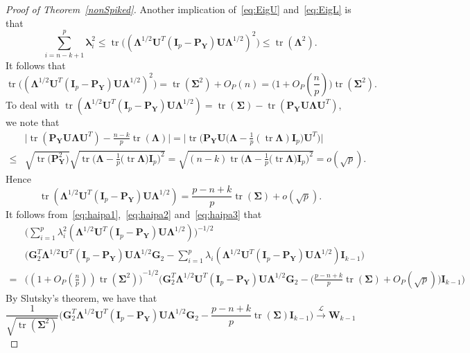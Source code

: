 \documentclass[12pt]{article} %
\DeclareMathOperator{\mytr}{tr}
\newcommand{\bP}{\mathbf{P}}
\newcommand{\bY}{\mathbf{Y}}
\newcommand{\bG}{\mathbf{G}}
\newcommand{\bI}{\mathbf{I}}
\newcommand{\bU}{\mathbf{U}}
\newcommand{\bW}{\mathbf{W}}
\newcommand{\bfsym}[1]{\ensuremath{\boldsymbol{#1}}}
\def\blambda {\bfsym {\lambda}}
\def\bLambda {\bfsym {\Lambda}}
\def\bSigma {\bfsym {\Sigma}}
\theoremstyle{definition}
\begin{document}
\begin{proof}[\textrm{Proof of Theorem~\ref{nonSpiked}}]
    Another implication of~\eqref{eq:EigU} and~\eqref{eq:EigL} is that
    $$
    \sum_{i=n-k+1}^p \blambda_i^2
    \leq
    \mytr\Big((\bLambda^{1/2}\bU^T (\bI_p-\bP_{\bY})\bU\bLambda^{1/2})^2\Big)\leq
    \mytr(\bLambda^2).
    $$ 
    It follows that
    \begin{equation}\label{eq:haipa2}
    \mytr\Big((\bLambda^{1/2}\bU^T (\bI_p-\bP_{\bY})\bU\bLambda^{1/2})^2\Big)
    =
    \mytr(\bSigma^2)+O_P(n)
    =
    \big(1+O_P(\frac{n}{p})\big)\mytr(\bSigma^2).
    \end{equation}
    To deal with
    $
    \mytr(\bLambda^{1/2}\bU^T (\bI_p-\bP_{\bY})\bU\bLambda^{1/2})
    =
    \mytr(\bSigma)-\mytr(\bP_{\bY}\bU\bLambda \bU^T)
    $,
    we note that
    $$
    \begin{aligned}
        &
        \big|
    \mytr(\bP_{\bY}\bU\bLambda \bU^T)
    -\frac{n-k}{p}\mytr(\bLambda)
    \big|
    =
    \big|
    \mytr\Big(\bP_{\bY} \bU \big(\bLambda-\frac{1}{p} (\mytr \bLambda) \bI_p \big) \bU^T\Big)
    \big|
        \\
        \leq &
        \sqrt{\mytr \big(\bP_{\bY}^2\big)}
        \sqrt{\mytr \Big(\bLambda-\frac{1}{p}\big(\mytr \bLambda\big) \bI_p\Big)^2}
        =\sqrt{(n-k)\mytr \Big(\bLambda-\frac{1}{p}\big(\mytr \bLambda\big) \bI_p\Big)^2}
        =o(\sqrt{p}).
    \end{aligned}
    $$
    Hence 
    \begin{equation}\label{eq:haipa3}
    \mytr(\bLambda^{1/2}\bU^T (\bI_p-\bP_{\bY})\bU\bLambda^{1/2})
    =
    \frac{p-n+k}{p}\mytr(\bSigma)+o(\sqrt{p}).
    \end{equation}
    It follows from~\eqref{eq:haipa1},~\eqref{eq:haipa2} and~\eqref{eq:haipa3} that
    $$
    \begin{aligned}
        &\Big(\sum_{i=1}^p \lambda_i^2(\bLambda^{1/2}\bU^T(\bI_p-\bP_{\bY})\bU\bLambda^{1/2})\Big)^{-1/2}\\
        &{\Big( \bG_2^T \bLambda^{1/2}\bU^T (\bI_p-\bP_{\bY})\bU\bLambda^{1/2}\bG_2-\sum_{i=1}^p \lambda_i(\bLambda^{1/2}\bU^T(\bI_p-\bP_{\bY})\bU\bLambda^{1/2})\bI_{k-1}\Big)}\\
        =&
        {\Big( (1+O_P(\frac{n}{p}))\mytr (\bSigma^2)\Big) }^{-1/2} {\Big( \bG_2^T \bLambda^{1/2}\bU^T (\bI_p-\bP_{\bY})\bU\bLambda^{1/2}\bG_2-
        \big(\frac{p-n+k}{p}\mytr(\bSigma)+O_P(\sqrt{p})\big)\bI_{k-1}
        \Big)}
    \end{aligned}
    $$
    By Slutsky's theorem, we have that
    $$
    \frac{1}{\sqrt{\mytr(\bSigma^2)}}
    {\Big( \bG_2^T \bLambda^{1/2}\bU^T (\bI_p-\bP_{\bY})\bU\bLambda^{1/2}\bG_2-
        \frac{p-n+k}{p}\mytr(\bSigma)\bI_{k-1}\Big)}
    \xrightarrow{\mathcal{L}}\bW_{k-1}
    $$


\end{proof}
\end{document}
